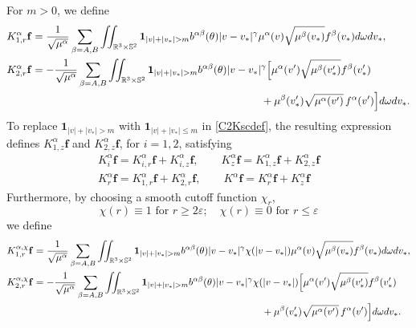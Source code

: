 \documentclass[reqno]{amsart}
\numberwithin{equation}{section}
\numberwithin{equation}{section}
\begin{document}
		For $m>0$, we define
	\begin{equation}\label{C2Kscdef}
		\begin{split}
			&	 K_{1,r}^{\alpha} \mathbf{f}=  \frac{1}{\sqrt{\mu^\alpha}} \sum_{\beta=A,B} \iint_{\mathbb{R}^3 \times \mathbb{S}^2}\mathbf{1}_{|v|+|v_*|>m}
			b^{ \alpha \beta}(\theta)|v-v_*|^{\gamma}  \mu^\alpha(v) \sqrt{\mu^\beta(v_*)}f^\beta(v_*)   d\omega dv_*,\\
			&	 K_{2,r}^{\alpha} \mathbf{f}= - \frac{1}{\sqrt{\mu^\alpha}} \sum_{\beta=A,B} \iint_{\mathbb{R}^3 \times \mathbb{S}^2}\mathbf{1}_{|v|+|v_*|>m}
			b^{ \alpha \beta}(\theta)|v-v_*|^{\gamma} \Big[\mu^\alpha(v')\sqrt{\mu^\beta(v_*')}f^\beta(v_*')\\
			& \hspace{8.5cm} +\mu^{\beta}(v_*') \sqrt{\mu^{\alpha}(v')}\, f^\alpha(v')\Big] d\omega dv_*.
		\end{split}	
	\end{equation}	
	To replace ‌$\mathbf{1}_{|v|+|v_*|>m}$ with ‌$\mathbf{1}_{|v|+|v_*|\leq m}$ in ‌\eqref{C2Kscdef}, the resulting expression defines ‌$K_{1,z}^{\alpha} \mathbf{f}$ and ‌$K_{2,z}^{\alpha} \mathbf{f}$, for $i=1,2$, satisfying
	\begin{equation*}
		\begin{split}
			K_{i}^{\alpha} \mathbf{f}=K_{i,r}^{\alpha} \mathbf{f}+K_{i,z}^{\alpha} \mathbf{f}, \qquad K_{z}^{\alpha} \mathbf{f}=K_{1,z}^{\alpha} \mathbf{f}+K_{2,z}^{\alpha} \mathbf{f}\\
			K_{r}^{\alpha} \mathbf{f}=K_{1,r}^{\alpha} \mathbf{f}+K_{2,r}^{\alpha} \mathbf{f}, \qquad K^{\alpha} \mathbf{f}=K_{r}^{\alpha} \mathbf{f}+K_{z}^{\alpha} \mathbf{f}
		\end{split}	
	\end{equation*}
	Furthermore‌, by choosing a smooth cutoff function $\chi_{r}$, 
	\begin{equation}\label{cutoffuctiondef}
		\chi(r) \equiv 1 \text{ for } r \geq 2\varepsilon;\quad \chi(r) \equiv 0 \text{ for } r \leq \varepsilon
	\end{equation}
	 we define
	\begin{equation}\label{C2KSchidef}
		\begin{split}
			&	 K_{1,r}^{\alpha,\chi} \mathbf{f}=  \frac{1}{\sqrt{\mu^\alpha}} \sum_{\beta=A,B} \iint_{\mathbb{R}^3 \times \mathbb{S}^2}\mathbf{1}_{|v|+|v_*|>m}
			b^{ \alpha \beta}(\theta)|v-v_*|^{\gamma} \chi(|v-v_*|) \mu^\alpha(v) \sqrt{\mu^\beta(v_*)}f^\beta(v_*)   d\omega dv_*,\\
			&	 K_{2,r}^{\alpha,\chi} \mathbf{f}= - \frac{1}{\sqrt{\mu^\alpha}} \sum_{\beta=A,B} \iint_{\mathbb{R}^3 \times \mathbb{S}^2}\mathbf{1}_{|v|+|v_*|>m}
			b^{ \alpha \beta}(\theta)|v-v_*|^{\gamma}\chi(|v-v_*|) \Big[\mu^\alpha(v')\sqrt{\mu^\beta(v_*')}f^\beta(v_*')\\
			& \hspace{9.1cm} +\mu^{\beta}(v_*') \sqrt{\mu^{\alpha}(v')}\, f^\alpha(v')\Big] d\omega dv_*.
		\end{split}	
	\end{equation}	
\end{document}
